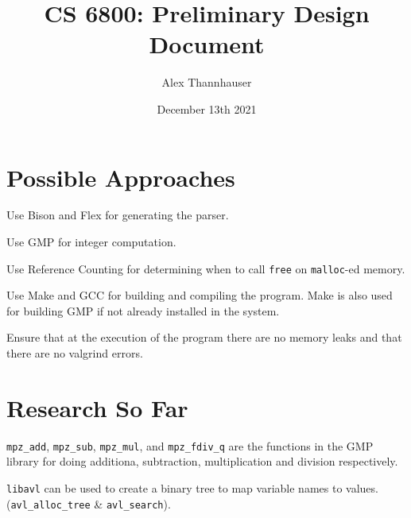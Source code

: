 \documentclass[letterpaper,11pt]{article}
\begin{document}
{
	\title{CS 6800: Preliminary Design Document}
	\author{Alex Thannhauser}
	\date{December 13th 2021}

	\maketitle
	
	\section{Possible Approaches}
	{
		\begin{itemize}
		{
			\item Use Bison and Flex for generating the parser.
			\item Use GMP for integer computation.
			\item Use Reference Counting for determining when to call
				\texttt{free} on \texttt{malloc}-ed memory.
			\item Use Make and GCC for building and compiling the program. Make
				is also used for building GMP if not already installed in
				the system.
			\item Ensure that at the execution of the program there are no
				memory leaks and that there are no valgrind errors.
		}
		\end{itemize}
	}
	
	\section{Research So Far}
	{
		\begin{itemize}
		{
			\item \texttt{mpz\_add}, \texttt{mpz\_sub}, \texttt{mpz\_mul}, and
				\texttt{mpz\_fdiv\_q} are the functions in the GMP library for
				doing additiona, subtraction, multiplication and division
				respectively.
			\item \texttt{libavl} can be used to create a binary tree to map
				variable names to values.
				(\texttt{avl\_alloc\_tree} \& \texttt{avl\_search}).
		}
		\end{itemize}
	}
	
}
\end{document}
